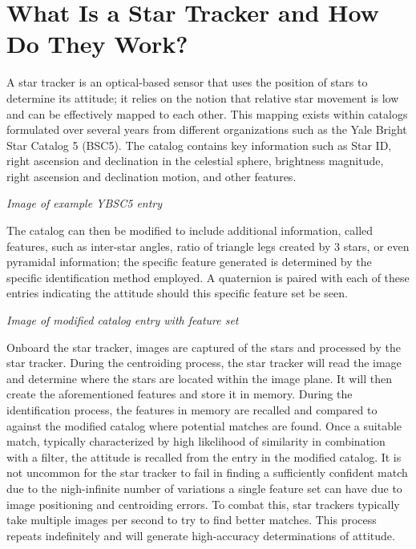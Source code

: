 \section{What Is a Star Tracker and How Do They Work?}
\par \qquad A star tracker is an optical-based sensor that uses the position of stars to determine its attitude; it relies on the notion that relative star movement is low and can be effectively mapped to each other.
This mapping exists within catalogs formulated over several years from different organizations such as the Yale Bright Star Catalog 5 (BSC5). 
The catalog contains key information such as Star ID, right ascension and declination in the celestial sphere, brightness magnitude, right ascension and declination motion, and other features.

\par \qquad \emph{Image of example YBSC5 entry}

\par \qquad The catalog can then be modified to include additional information, called features, such as inter-star angles, ratio of triangle legs created by 3 stars, or even pyramidal information; the specific feature generated is determined by the specific identification method employed.
A quaternion is paired with each of these entries indicating the attitude should this specific feature set be seen.

\par \qquad \emph{Image of modified catalog entry with feature set}

\par \qquad Onboard the star tracker, images are captured of the stars and processed by the star tracker.
During the centroiding process, the star tracker will read the image and determine where the stars are located within the image plane.
It will then create the aforementioned features and store it in memory.
During the identification process, the features in memory are recalled and compared to against the modified catalog where potential matches are found.
Once a suitable match, typically characterized by high likelihood of similarity in combination with a filter, the attitude is recalled from the entry in the modified catalog.
It is not uncommon for the star tracker to fail in finding a sufficiently confident match due to the nigh-infinite number of variations a single feature set can have due to image positioning and centroiding errors.
To combat this, star trackers typically take multiple images per second to try to find better matches.
This process repeats indefinitely and will generate high-accuracy determinations of attitude.

